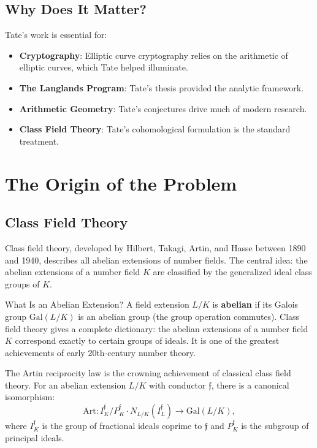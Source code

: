 \subsection{Why Does It Matter?}

Tate's work is essential for:
\begin{itemize}
\item \textbf{Cryptography}: Elliptic curve cryptography relies on the arithmetic of elliptic curves, which Tate helped illuminate.
\item \textbf{The Langlands Program}: Tate's thesis provided the analytic framework.
\item \textbf{Arithmetic Geometry}: Tate's conjectures drive much of modern research.
\item \textbf{Class Field Theory}: Tate's cohomological formulation is the standard treatment.
\end{itemize}

\section{The Origin of the Problem}

\subsection{Class Field Theory}

Class field theory, developed by Hilbert, Takagi, Artin, and Hasse between 1890 and 1940, describes all abelian extensions of number fields. The central idea: the abelian extensions of a number field $K$ are classified by the generalized ideal class groups of $K$.

\begin{knowledgebridge}{What Is an Abelian Extension?}
A field extension $L/K$ is \textbf{abelian} if its Galois group $\mathrm{Gal}(L/K)$ is an abelian group (the group operation commutes). Class field theory gives a complete dictionary: the abelian extensions of a number field $K$ correspond exactly to certain groups of ideals. It is one of the greatest achievements of early 20th-century number theory.
\end{knowledgebridge}

The Artin reciprocity law is the crowning achievement of classical class field theory. For an abelian extension $L/K$ with conductor $\mathfrak{f}$, there is a canonical isomorphism:
\[
\mathrm{Art}: I_K^{\mathfrak{f}} / P_K^{\mathfrak{f}} \cdot N_{L/K}(I_L^{\mathfrak{f}}) \to \mathrm{Gal}(L/K),
\]
where $I_K^{\mathfrak{f}}$ is the group of fractional ideals coprime to $\mathfrak{f}$ and $P_K^{\mathfrak{f}}$ is the subgroup of principal ideals.

